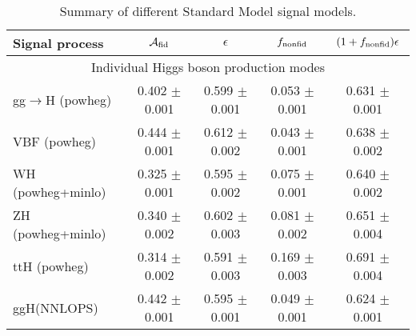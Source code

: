 \documentclass{article}
\begin{document}
\begin{table}[!h!tb]
\begin{center}
\small
\caption{
Summary of different Standard Model signal models.
\label{tab:summarySM}
}
\begin{tabular}{|l|c|c|c|c|} \hline \hline 
\textbf{Signal process} & $\mathcal{A}_{\rm fid}$ & $\epsilon$ & $f_{\rm nonfid}$  & $(1+f_{\rm nonfid})\epsilon$ \\ \hline \hline 
\multicolumn{5}{|c|}{Individual Higgs boson production modes} \\ \hline 
gg$\rightarrow$H ({\sc powheg})  & 0.402 $\pm$ 0.001 & 0.599 $\pm$ 0.001 & 0.053 $\pm$ 0.001 & 0.631 $\pm$ 0.001 \\ 
 VBF ({\sc powheg})  & 0.444 $\pm$ 0.001 & 0.612 $\pm$ 0.002 & 0.043 $\pm$ 0.001 & 0.638 $\pm$ 0.002 \\ 
 WH ({\sc powheg+minlo}) & 0.325 $\pm$ 0.001 & 0.595 $\pm$ 0.002 & 0.075 $\pm$ 0.001 & 0.640 $\pm$ 0.002 \\ 
 ZH ({\sc powheg+minlo})  & 0.340 $\pm$ 0.002 & 0.602 $\pm$ 0.003 & 0.081 $\pm$ 0.002 & 0.651 $\pm$ 0.004 \\ 
 ttH ({\sc powheg}) & 0.314 $\pm$ 0.002 & 0.591 $\pm$ 0.003 & 0.169 $\pm$ 0.003 & 0.691 $\pm$ 0.004 \\ 
 ggH(NNLOPS) & 0.442 $\pm$ 0.001 & 0.595 $\pm$ 0.001 & 0.049 $\pm$ 0.001 & 0.624 $\pm$ 0.001 \\ 
 
\hline \hline
\end{tabular}
\normalsize
\end{center}
\end{table}
\end{document}
